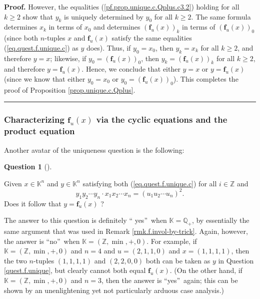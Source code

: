 \documentclass[numbers=enddot,12pt,final,onecolumn,notitlepage]{scrartcl}%
\theoremstyle{definition}
\newtheorem{quest}[theo]{Question}
\newenvironment{question}[1][]
{\begin{quest}[#1]\begin{leftbar}}
{\end{leftbar}\end{quest}}
\newenvironment{proof}[1][Proof]{\noindent\textbf{#1.} }{\ \rule{0.5em}{0.5em}}
\newenvironment{question}[1][Question]{\noindent\textbf{#1.} }{\ \rule{0.5em}{0.5em}}
\newenvironment{verlong}{}{}
\begin{document}
\begin{verlong}
\begin{proof}
However, the equalities (\ref{pf.prop.unique.c.Qplus.c3.2}) holding for all
$k\geq2$ show that $y_{k}$ is uniquely determined by $y_{0}$ for all $k\geq2$.
The same formula determines $x_{k}$ in terms of $x_{0}$ and determines
$\left(  \mathbf{f}_{u}\left(  x\right)  \right)  _{k}$ in terms of $\left(
\mathbf{f}_{u}\left(  x\right)  \right)  _{0}$ (since both $n$-tuples $x$ and
$\mathbf{f}_{u}\left(  x\right)  $ satisfy the same equalities
(\ref{eq.quest.f.unique.c}) as $y$ does). Thus, if $y_{0}=x_{0}$, then
$y_{k}=x_{k}$ for all $k\geq2$, and therefore $y=x$; likewise, if
$y_{0}=\left(  \mathbf{f}_{u}\left(  x\right)  \right)  _{0}$, then
$y_{k}=\left(  \mathbf{f}_{u}\left(  x\right)  \right)  _{k}$ for all $k\geq
2$, and therefore $y=\mathbf{f}_{u}\left(  x\right)  $. Hence, we conclude
that either $y=x$ or $y=\mathbf{f}_{u}\left(  x\right)  $ (since we know that
either $y_{0}=x_{0}$ or $y_{0}=\left(  \mathbf{f}_{u}\left(  x\right)
\right)  _{0}$). This completes the proof of Proposition
\ref{prop.unique.c.Qplus}.
\end{proof}
\end{verlong}

\subsubsection{Characterizing $\mathbf{f}_{u}\left(  x\right)  $ via the
cyclic equations and the product equation}

Another avatar of the uniqueness question is the following:

\begin{question}
\label{quest.f.unique}Given $x\in\mathbb{K}^{n}$ and $y\in\mathbb{K}^{n}$
satisfying both (\ref{eq.quest.f.unique.c}) for all $i\in\mathbb{Z}$ and
\begin{equation}
y_{1}y_{2}\cdots y_{n}\cdot x_{1}x_{2}\cdots x_{n}=\left(  u_{1}u_{2}\cdots
u_{n}\right)  ^{2}. \label{eq.quest.f.unique.b}%
\end{equation}
Does it follow that $y=\mathbf{f}_{u}\left(  x\right)  $ ?
\end{question}

The answer to this question is definitely \textquotedblleft
yes\textquotedblright\ when $\mathbb{K}=\mathbb{Q}_{+}$, by essentially the
same argument that was used in Remark \ref{rmk.f.invol-by-trick}. Again,
however, the answer is \textquotedblleft no\textquotedblright\ when
$\mathbb{K}=\left(  \mathbb{Z},\min,+,0\right)  $. For example, if
$\mathbb{K}=\left(  \mathbb{Z},\min,+,0\right)  $ and $n=4$ and $u=\left(
2,1,1,0\right)  $ and $x=\left(  1,1,1,1\right)  $, then the two $n$-tuples
$\left(  1,1,1,1\right)  $ and $\left(  2,2,0,0\right)  $ both can be taken as
$y$ in Question \ref{quest.f.unique}, but clearly cannot both equal
$\mathbf{f}_{u}\left(  x\right)  $. (On the other hand, if
$\mathbb{K}=\left(  \mathbb{Z},\min,+,0\right)  $ and $n=3$, then
the answer is \textquotedblleft yes\textquotedblright\ again; this can
be shown by an unenlightening yet not particularly arduous case analysis.)
\end{document}
